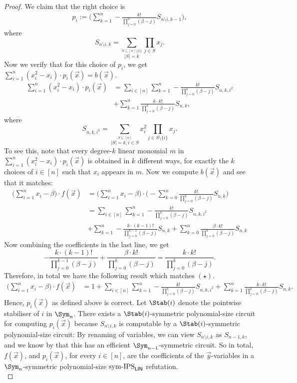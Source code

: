 \documentclass[a4paper,UKenglish,cleveref, autoref, thm-restate]{lipics-v2021}
\newcommand{\symIPSlin}{\text{ \upshape sym-IPS}_{\mathsf{LIN}}}
\begin{document}
\begin{proof}
	We claim that the right choice is
	\begin{align*}
		p_i :=  \Big(\sum_{k=1}^n -\frac{k!}{\prod_{j = 0}^k (\beta - j)} S_{n \setminus i,k-1} \Big),
	\end{align*}	
	where \[
	S_{n \setminus i,k} = \sum_{\stackrel{S \subseteq [n] \setminus \{i\}}{|S| = k}} \prod_{j \in S} x_j.
	\]
	Now we verify that for this choice of $p_i$, we get $\sum_{i=1}^n (x_i^2 -x_i) \cdot p_i(\vec x) = b(\vec x)$.
	\begin{align*}
		\sum_{i=1}^n (x_i^2 -x_i) \cdot p_i(\vec x) &= \sum_{i \in [n]}\sum_{k=1}^n - \frac{k!}{\prod_{j = 0}^k (\beta - j)} S_{n,k,i^2}\\
		&+ \sum_{k=1}^n \frac{k \cdot k!}{\prod_{j = 0}^k (\beta - j)} S_{n,k}, \tag{$\star$}
	\end{align*}	
	where 
	\[
	S_{n,k,i^2} = \sum_{\stackrel{S \subseteq [n]}{|S| = k, i \in S}} x_i^2 \prod_{j \in S \setminus \{i\}} x_j.
	\]
	To see this, note that every degree-$k$ linear monomial $m$ in $\sum_{i=1}^n (x_i^2 -x_i) \cdot p_i(\vec x)$ is obtained in $k$ different ways, for exactly the $k$ choices of $i \in [n]$ such that $x_i$ appears in $m$. Now we compute $b(\vec x)$ and see that it matches:
	\begin{align*}
		\Big(\sum_{i=1}^n x_i - \beta \Big) \cdot f(\vec x) &=  \Big(\sum_{i=1}^n x_i - \beta \Big) \cdot \Big(- \sum_{k=0}^n \frac{k!}{\prod_{j=0}^k (\beta -j)} S_{n,k}\Big)\\	 
		&= \sum_{i \in [n]}\sum_{k=1}^n - \frac{k!}{\prod_{j = 0}^k (\beta - j)} S_{n,k,i^2}\\
		&+ \sum_{k=1}^{n} -\frac{k \cdot (k-1)!}{\prod_{j = 0}^{k-1} (\beta - j)} S_{n,k} + \sum_{k=0}^n \frac{\beta \cdot k!}{\prod_{j = 0}^{k} (\beta - j)} S_{n,k} 
	\end{align*}	
	Now combining the coefficients in the last line, we get
	\[
	-\frac{k \cdot (k-1)!}{\prod_{j = 0}^{k-1} (\beta - j)} + \frac{\beta \cdot k!}{\prod_{j = 0}^{k} (\beta - j)}  =  \frac{k \cdot k!}{\prod_{j = 0}^k (\beta - j)}. 
	\]
	Therefore, in total we have the following result which matches $(\star)$.
	\begin{align*}
		\Big(\sum_{i=1}^n x_i - \beta \Big) \cdot f(\vec x) &= 1+ \sum_{i \in [n]}\sum_{k=1}^n - \frac{k!}{\prod_{j = 0}^k (\beta - j)} S_{n,k,i^2} + \sum_{k=1}^n \frac{k \cdot k!}{\prod_{j = 0}^k (\beta - j)} S_{n,k}.
	\end{align*}	
	Hence, $p_i(\vec x)$ as defined above is correct. Let $\Stab(i)$ denote the pointwise stabiliser of $i$ in $\Sym_n$. There exists a $\Stab(i)$-symmetric polynomial-size circuit for computing $p_i(\vec x)$ because $S_{n \setminus i,k}$ is computable by a $\Stab(i)$-symmetric polynomial-size circuit: By renaming of variables, we can view $S_{n \setminus i,k}$ as $S_{n-1,k}$, and we know by \cite{shpilka2001depth} that this has an efficient $\Sym_{n-1}$-symmetric circuit. So in total, $f(\vec x)$, and $p_i(\vec x)$, for every $i \in [n]$, are the coefficients of the $\vec y$-variables in a $\Sym_n$-symmetric polynomial-size$\symIPSlin{}$ refutation.\\
	

\end{proof}
\end{document}

